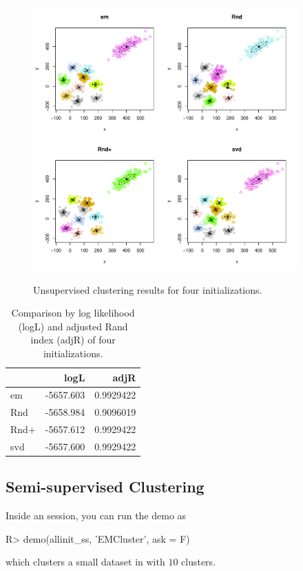 \begin{figure}[h]
\caption{Unsupervised clustering results for four initializations.}
\centering
\includegraphics[width=4in]{./EMCluster-include/allinit}
\label{fig:unsupervised}
\end{figure}

\begin{table}[h]
\centering
\begin{tabular}{l|rr} \hline \hline
     &      logL &      adjR \\ \hline
em   & -5657.603 & 0.9929422 \\
Rnd  & -5658.984 & 0.9096019 \\
Rnd+ & -5657.612 & 0.9929422 \\
svd  & -5657.600 & 0.9929422 \\ \hline \hline
\end{tabular}
\caption{Comparison by
log likelihood (logL) and adjusted Rand index (adjR) of four
initializations.}
\label{tab:unsupervised}
\end{table}




\subsection[Semi-supervised Clustering]{Semi-supervised Clustering}
\label{sec:semi-supervised}

Inside an  session, you can run the demo as
\begin{Code}[title=unsupervised]
R> demo(allinit_ss, 'EMCluster', ask = F)
\end{Code}
which clusters a small dataset  in  with
$10$ clusters.

